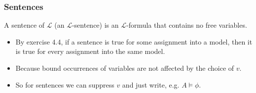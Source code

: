 \documentclass[handout]{beamer}
\newcommand{\sL}{\mathscr{L}}
\begin{document}
\begin{frame}
\frametitle{Sentences}
\begin{definition}[Sentence]
A sentence of $\sL$ (an $\sL$-sentence) is an $\sL$-formula that contains no free variables.
\end{definition}
\vspace{0.5cm}
\begin{itemize}
\item By exercise 4.4, if a sentence is true for some assignment into a model, then it is true for every assignment into the same model. 
\vspace{0.3cm}
\item Because bound occurrences of variables are not affected by the choice of $v$.
\vspace{0.3cm}
\item So for sentences we can suppress $v$ and just write, e.g. $A\models \phi$.
\end{itemize}
\end{frame}
\end{document}

